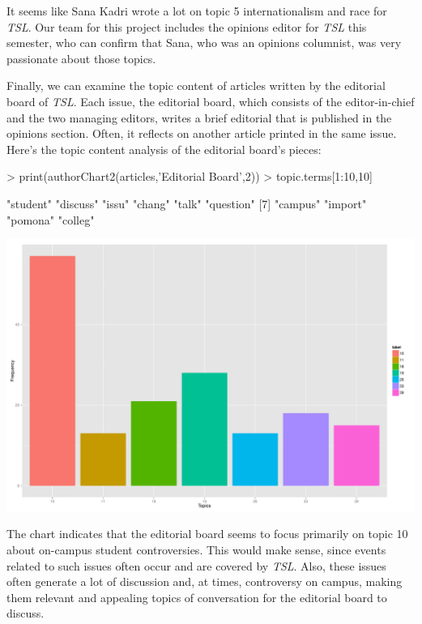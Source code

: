\documentclass[a4paper]{article}
\begin{document}
It seems like Sana Kadri wrote a lot on topic 5 internationalism and race for \textit{TSL}. Our team for this project includes the opinions editor for \textit{TSL} this semester, who can confirm that Sana, who was an opinions columnist, was very passionate about those topics.

Finally, we can examine the topic content of articles written by the editorial board of \textit{TSL}. Each issue, the editorial board, which consists of the editor-in-chief and the two managing editors, writes a brief editorial that is published in the opinions section. Often, it reflects on another article printed in the same issue. Here's the topic content analysis of the editorial board's pieces:

\begin{Schunk}
\begin{Sinput}
> print(authorChart2(articles,'Editorial Board',2))
> topic.terms[1:10,10]
\end{Sinput}
\begin{Soutput}
 [1] "student"  "discuss"  "issu"     "chang"    "talk"     "question"
 [7] "campus"   "import"   "pomona"   "colleg"  
\end{Soutput}
\end{Schunk}
\includegraphics{FinalProject-012}

The chart indicates that the editorial board seems to focus primarily on topic 10 about on-campus student controversies. This would make sense, since events related to such issues often occur and are covered by \textit{TSL}. Also, these issues often generate a lot of discussion and, at times, controversy on campus, making them relevant and appealing topics of conversation for the editorial board to discuss.
\end{document}
